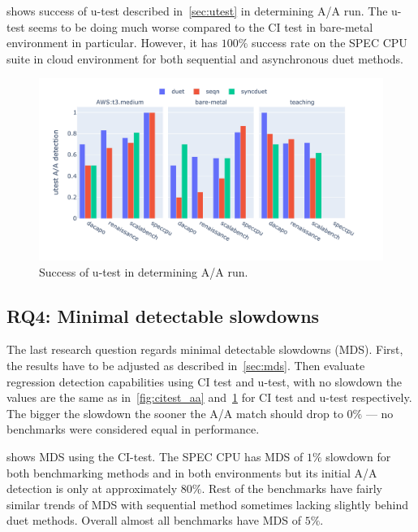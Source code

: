  shows success of \mbox{u-test} described in~\cref{sec:utest} in determining A/A run.
The \mbox{u-test} seems to be doing much worse compared to the CI test in bare-metal environment in particular.
However, it has $100\%$ success rate on the SPEC CPU suite in cloud environment for both sequential and asynchronous duet methods.

\begin{figure}
	\centering
	\includegraphics[width=1\linewidth]{./figures/utest_aa_match.pdf}
	\caption{
		Success of \mbox{u-test} in determining A/A run.
	}
	\label{fig:utest_aa}
\end{figure}

\subsection{RQ4: Minimal detectable slowdowns}
\label{sec:rq4}

The last research question regards minimal detectable slowdowns (MDS).
First, the results have to be adjusted as described in~\cref{sec:mds}.
Then evaluate regression detection capabilities using CI test and \mbox{u-test}, with no slowdown the values are the same as in~\cref{fig:citest_aa} and~\cref{fig:utest_aa} for CI test and \mbox{u-test} respectively.
The bigger the slowdown the sooner the A/A match should drop to $0\%$ --- no benchmarks were considered equal in performance.

 shows MDS using the CI-test.
The SPEC CPU has MDS of $1\%$ slowdown for both benchmarking methods and in both environments but its initial A/A detection is only at approximately $80\%$.
Rest of the benchmarks have fairly similar trends of MDS with sequential method sometimes lacking slightly behind duet methods.
Overall almost all benchmarks have MDS of $5\%$.

